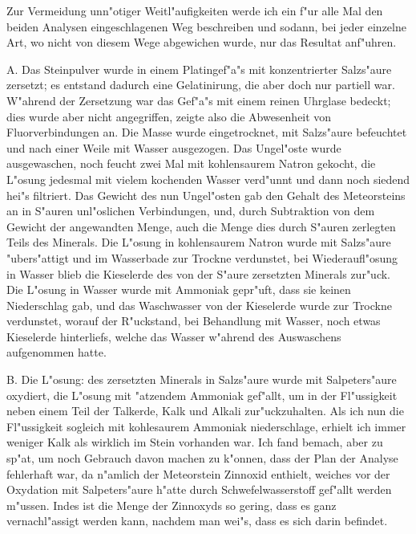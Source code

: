 \documentclass[a4paper, 11pt, oneside]{article}
\begin{document}
Zur Vermeidung unn"otiger Weitl"aufigkeiten werde ich ein f"ur alle Mal den beiden Analysen eingeschlagenen Weg beschreiben und sodann, bei jeder einzelne Art, wo nicht von diesem Wege abgewichen wurde, nur das Resultat anf"uhren.

A. Das Steinpulver wurde in einem Platingef"a"s mit konzentrierter Salzs"aure zersetzt; es entstand dadurch eine Gelatinirung, die aber doch nur partiell war. W"ahrend der Zersetzung war das Gef"a"s mit einem reinen Uhrglase bedeckt; dies wurde aber nicht angegriffen, zeigte also die Abwesenheit von Fluorverbindungen an. Die Masse wurde eingetrocknet, mit Salzs"aure befeuchtet und nach einer Weile mit Wasser ausgezogen. Das Ungel"oste wurde ausgewaschen, noch feucht zwei Mal mit kohlensaurem Natron gekocht, die L"osung jedesmal mit vielem kochenden Wasser verd"unnt und dann noch siedend hei"s filtriert. Das Gewicht des nun Ungel"osten gab den Gehalt des Meteorsteins an in S"auren unl"oslichen Verbindungen, und, durch Subtraktion von dem Gewicht der angewandten Menge, auch die Menge dies durch S"auren zerlegten Teils des Minerals. Die L"osung in kohlensaurem Natron wurde mit Salzs"aure "ubers"attigt und im Wasserbade zur Trockne verdunstet, bei Wiederaufl"osung in Wasser blieb die Kieselerde des von der S"aure zersetzten Minerals zur"uck. Die L"osung in Wasser wurde mit Ammoniak gepr"uft, dass sie keinen Niederschlag gab, und das Waschwasser von der Kieselerde wurde zur Trockne verdunstet, worauf der R"uckstand, bei Behandlung mit Wasser, noch etwas Kieselerde hinterliefs, welche das Wasser w"ahrend des Auswaschens aufgenommen hatte.

B. Die L"osung: des zersetzten Minerals in Salzs"aure wurde mit Salpeters"aure oxydiert, die L"osung mit "atzendem Ammoniak gef"allt, um in der Fl"ussigkeit neben einem Teil der Talkerde, Kalk und Alkali zur"uckzuhalten. Als ich nun die Fl"ussigkeit sogleich mit kohlesaurem Ammoniak niederschlage, erhielt ich immer weniger Kalk als wirklich im Stein vorhanden war. Ich fand bemach, aber zu sp"at, um noch Gebrauch davon machen zu k"onnen, dass der Plan der Analyse fehlerhaft war, da n"amlich der Meteorstein Zinnoxid enthielt, weiches vor der Oxydation mit Salpeters"aure h"atte durch Schwefelwasserstoff gef"allt werden m"ussen. Indes ist die Menge der Zinnoxyds so gering, dass es ganz vernachl"assigt werden kann, nachdem man wei"s, dass es sich darin befindet.
\end{document}
